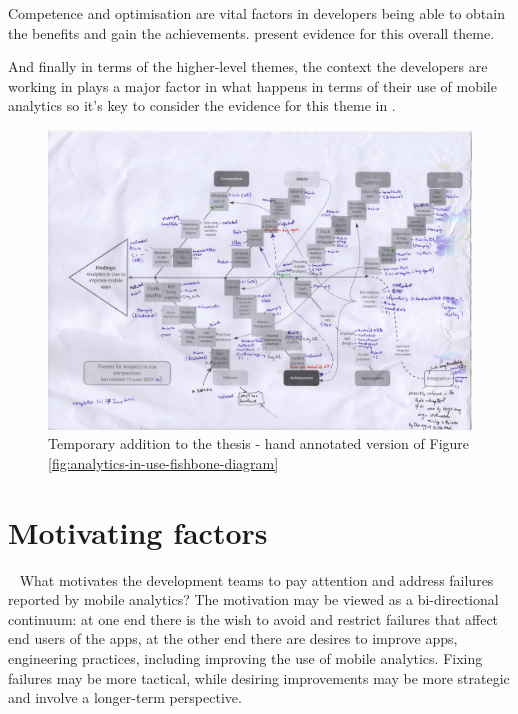 Competence and optimisation are vital factors in developers being able to obtain the benefits and gain the achievements.  present evidence for this overall theme.

And finally in terms of the higher-level themes, the context the developers are working in plays a major factor in what happens in terms of their use of mobile analytics so it's key to consider the evidence for this theme in .

\begin{figure}
    \centering
    \includegraphics[width=\textwidth]{images/rough-sketches/Annotated-analytics-in-use-17-jun-2022.jpeg}
    \caption{Temporary addition to the thesis - hand annotated version of Figure \ref{fig:analytics-in-use-fishbone-diagram}}
    \label{fig:hand-annotated-analytics-in-use-fishbone-diagram}
\end{figure}

\section{Motivating factors}~\label{aiu-motivating-factors-section}
What motivates the development teams to pay attention and address failures reported by mobile analytics? The motivation may be viewed as a bi-directional continuum: at one end there is the wish to avoid and restrict failures that affect end users of the apps, at the other end there are desires to improve apps, engineering practices, including improving the use of mobile analytics. Fixing failures may be more tactical, while desiring improvements may be more strategic and involve a longer-term perspective.

